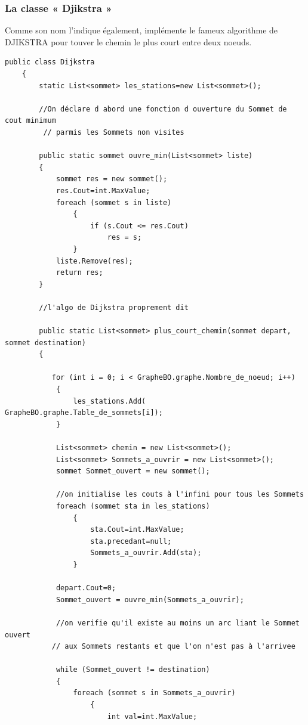 \documentclass[11pt,twoside,a4paper]{article}
\begin{document}
\subsubsection{La classe « Djikstra »}
 Comme son nom l'indique également, implémente le fameux algorithme de DJIKSTRA pour touver le chemin le plus court entre deux noeuds.
\begin{verbatim}
public class Dijkstra
    {
        static List<sommet> les_stations=new List<sommet>();
      
        //On déclare d abord une fonction d ouverture du Sommet de cout minimum
         // parmis les Sommets non visites

        public static sommet ouvre_min(List<sommet> liste)
        {
            sommet res = new sommet();
            res.Cout=int.MaxValue;
            foreach (sommet s in liste)
                {
                    if (s.Cout <= res.Cout)
                        res = s;
                }
            liste.Remove(res);
            return res;
        }

        //l'algo de Dijkstra proprement dit

        public static List<sommet> plus_court_chemin(sommet depart, sommet destination)
        {
	 
           for (int i = 0; i < GrapheBO.graphe.Nombre_de_noeud; i++)    
            {
                les_stations.Add( GrapheBO.graphe.Table_de_sommets[i]);
            }

            List<sommet> chemin = new List<sommet>();
            List<sommet> Sommets_a_ouvrir = new List<sommet>();
            sommet Sommet_ouvert = new sommet(); 

            //on initialise les couts à l'infini pour tous les Sommets 
            foreach (sommet sta in les_stations)
                {
                    sta.Cout=int.MaxValue;
                    sta.precedant=null;
                    Sommets_a_ouvrir.Add(sta);
                }

            depart.Cout=0;
            Sommet_ouvert = ouvre_min(Sommets_a_ouvrir);

            //on verifie qu'il existe au moins un arc liant le Sommet ouvert
           // aux Sommets restants et que l'on n'est pas à l'arrivee
            
            while (Sommet_ouvert != destination)
            {
                foreach (sommet s in Sommets_a_ouvrir)
                    {
                        int val=int.MaxValue;    


\end{verbatim}
\end{document}
